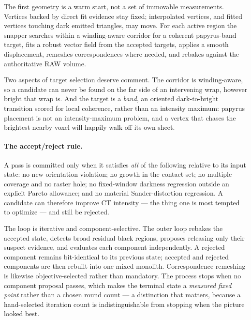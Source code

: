 The first geometry is a warm start, not a set of immovable measurements. Vertices backed by direct fit evidence stay fixed; interpolated vertices, and fitted vertices touching dark emitted triangles, may move. For each active region the snapper searches within a winding-aware corridor for a coherent papyrus-band target, fits a robust vector field from the accepted targets, applies a smooth displacement, remeshes correspondences where needed, and rebakes against the authoritative RAW volume.

Two aspects of target selection deserve comment. The corridor is winding-aware, so a candidate can never be found on the far side of an intervening wrap, however bright that wrap is. And the target is a \emph{band}, an oriented dark-to-bright transition scored for local coherence, rather than an intensity maximum: papyrus placement is not an intensity-maximum problem, and a vertex that chases the brightest nearby voxel will happily walk off its own sheet.

\paragraph{The accept/reject rule.} A pass is committed only when it satisfies \emph{all} of the following relative to its input state: no new orientation violation; no growth in the contact set; no multiple coverage and no raster hole; no fixed-window darkness regression outside an explicit Pareto allowance; and no material Sander-distortion regression. A candidate can therefore improve CT intensity --- the thing one is most tempted to optimize --- and still be rejected.

The loop is iterative and component-selective. The outer loop rebakes the accepted state, detects broad residual black regions, proposes releasing only their suspect evidence, and evaluates each component independently. A rejected component remains bit-identical to its previous state; accepted and rejected components are then rebuilt into one mixed monolith. Correspondence remeshing is likewise objective-selected rather than mandatory. The process stops when no component proposal passes, which makes the terminal state a \emph{measured fixed point} rather than a chosen round count --- a distinction that matters, because a hand-selected iteration count is indistinguishable from stopping when the picture looked best.

